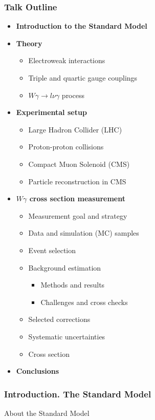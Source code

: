 \begin{frame}\frametitle{Talk Outline}
  \begin{itemize}
     \item {\scriptsize\bfseries{Introduction to the Standard Model}}
     \item {\scriptsize\bfseries{Theory}}
       \begin{itemize}
          \tiny
          \item Electroweak interactions
          \item Triple and quartic gauge couplings
          \item $W\gamma\rightarrow l\nu\gamma$ process
       \end{itemize}
     \item {\scriptsize\bfseries{Experimental setup}}
       \begin{itemize}
          \tiny
          \item Large Hadron Collider (LHC)
          \item Proton-proton collisions
          \item Compact Muon Solenoid (CMS)
          \item Particle reconstruction in CMS
       \end{itemize}
     \item {\scriptsize\bfseries{$W\gamma$ cross section measurement}}
       \begin{itemize}
          \tiny
          \item Measurement goal and strategy 
          \item Data and simulation (MC) samples
          \item Event selection
          \item Background estimation
             \begin{itemize}
                \tiny
                \item Methods and results
                \item Challenges and cross checks 
             \end{itemize}
         \item Selected corrections
         \item Systematic uncertainties
         \item Cross section
       \end{itemize}
     \item {\scriptsize\bfseries{Conclusions}}
  \end{itemize}
\end{frame}%

\begin{frame}\frametitle{Introduction. The Standard Model}
\scriptsize
About the Standard Model
\end{frame}%

